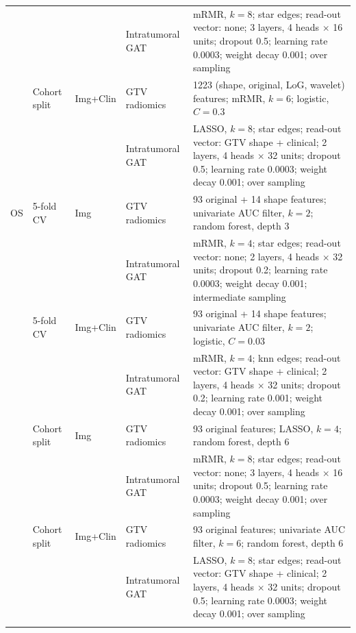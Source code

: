 \begin{tabular}{@{}llllp{}@{}}
 & & & Intratumoral GAT & mRMR, $k=8$; star edges; read-out vector: none; 3 layers, 4 heads $\times$ 16 units; dropout 0.5; learning rate 0.0003; weight decay 0.001; over sampling \\
 & Cohort split & Img+Clin & GTV radiomics & 1223 (shape, original, LoG, wavelet) features; mRMR, $k=6$; logistic, $C=0.3$ \\
 & & & Intratumoral GAT & LASSO, $k=8$; star edges; read-out vector: GTV shape + clinical; 2 layers, 4 heads $\times$ 32 units; dropout 0.5; learning rate 0.0003; weight decay 0.001; over sampling \\
\midrule
OS & 5-fold CV & Img & GTV radiomics & 93 original + 14 shape features; univariate AUC filter, $k=2$; random forest, depth 3 \\
 & & & Intratumoral GAT & mRMR, $k=4$; star edges; read-out vector: none; 2 layers, 4 heads $\times$ 32 units; dropout 0.2; learning rate 0.0003; weight decay 0.001; intermediate sampling \\
 & 5-fold CV & Img+Clin & GTV radiomics & 93 original + 14 shape features; univariate AUC filter, $k=2$; logistic, $C=0.03$ \\
 & & & Intratumoral GAT & mRMR, $k=4$; knn edges; read-out vector: GTV shape + clinical; 2 layers, 4 heads $\times$ 32 units; dropout 0.2; learning rate 0.001; weight decay 0.001; over sampling \\
 & Cohort split & Img & GTV radiomics & 93 original features; LASSO, $k=4$; random forest, depth 6 \\
 & & & Intratumoral GAT & mRMR, $k=8$; star edges; read-out vector: none; 3 layers, 4 heads $\times$ 16 units; dropout 0.5; learning rate 0.0003; weight decay 0.001; over sampling \\
 & Cohort split & Img+Clin & GTV radiomics & 93 original features; univariate AUC filter, $k=6$; random forest, depth 6 \\
 & & & Intratumoral GAT & LASSO, $k=8$; star edges; read-out vector: GTV shape + clinical; 2 layers, 4 heads $\times$ 32 units; dropout 0.5; learning rate 0.0003; weight decay 0.001; over sampling \\
\botrule
\end{tabular}
